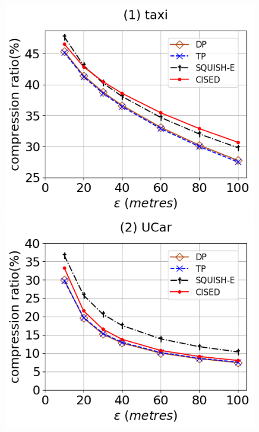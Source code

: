 \begin{figure}[tb!]
	\centering
	\includegraphics[scale=0.315]{Figures/Exp-SED-CR-epsilon-taxi.png}\hspace{1ex}
	\includegraphics[scale=0.315]{Figures/Exp-SED-CR-epsilon-service.png} 	\hspace{1ex}

\end{figure}
